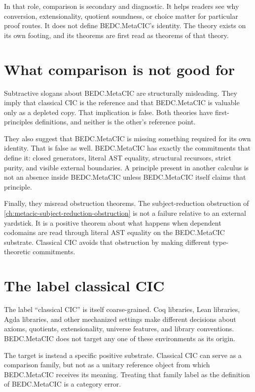In that role, comparison is secondary and diagnostic. It helps readers
see why conversion, extensionality, quotient soundness, or choice matter
for particular proof routes. It does not define BEDC.MetaCIC's identity.
The theory exists on its own footing, and its theorems are first read as
theorems of that theory.

\section{What comparison is not good for}
\label{sec:bedc-is-its-own-theory-comparison-not-good}

Subtractive slogans about BEDC.MetaCIC are structurally misleading. They
imply that classical CIC is the reference and that BEDC.MetaCIC is
valuable only as a depleted copy. That implication is false. Both
theories have first-principles definitions, and neither is the other's
reference point.

They also suggest that BEDC.MetaCIC is missing something required for
its own identity. That is false as well. BEDC.MetaCIC has exactly the
commitments that define it: closed generators, literal AST equality,
structural recursors, strict purity, and visible external boundaries. A
principle present in another calculus is not an absence inside
BEDC.MetaCIC unless BEDC.MetaCIC itself claims that principle.

Finally, they misread obstruction theorems. The subject-reduction
obstruction of \autoref{ch:metacic-subject-reduction-obstruction} is
not a failure relative to an external yardstick. It is a positive theorem
about what happens when dependent codomains are read through literal AST
equality on the BEDC.MetaCIC substrate. Classical CIC avoids that
obstruction by making different type-theoretic commitments.

\section{The label classical CIC}
\label{sec:bedc-is-its-own-theory-classical-label}

The label ``classical CIC'' is itself coarse-grained. Coq libraries,
Lean libraries, Agda libraries, and other mechanized settings make
different decisions about axioms, quotients, extensionality, universe
features, and library conventions. BEDC.MetaCIC does not target any one
of these environments as its origin.

The target is instead a specific positive substrate. Classical CIC can
serve as a comparison family, but not as a unitary reference object from
which BEDC.MetaCIC receives its meaning. Treating that family label as
the definition of BEDC.MetaCIC is a category error.

